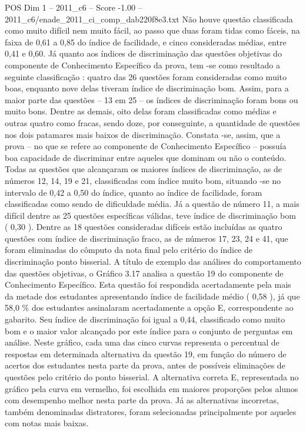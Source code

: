 \begin{textsample}{POS Dim 1 – 2011\_c6 – Score -1.00 – 2011\_c6/enade\_2011\_ci\_comp\_dab220f8e3.txt}
Não houve questão classificada como muito difícil nem muito fácil, ao passo que duas foram tidas como fáceis, na faixa de 0,61 a 0,85 do índice de facilidade, e cinco consideradas médias, entre 0,41 e 0,60.
Já quanto aos índices de discriminação das questões objetivas do componente de Conhecimento Específico da prova, tem -se como resultado a seguinte classificação : quatro das 26 questões foram consideradas como muito boas, enquanto nove delas tiveram índice de discriminação bom.
Assim, para a maior parte das questões – 13 em 25 – os índices de discriminação foram bons ou muito bons.
Dentre as demais, oito delas foram classificadas como médias e outras quatro como fracas, sendo doze, por conseguinte, a quantidade de questões nos dois patamares mais baixos de discriminação.
Constata -se, assim, que a prova – no que se refere ao componente de Conhecimento Específico – possuía boa capacidade de discriminar entre aqueles que dominam ou não o conteúdo.
Todas as questões que alcançaram os maiores índices de discriminação, as de números 12, 14, 19 e 21, classificadas com índice muito bom, situando -se no intervalo de 0,42 a 0,50 do índice, quanto ao índice de facilidade, foram classificadas como sendo de dificuldade média.
Já a questão de número 11, a mais difícil dentre as 25 questões específicas válidas, teve índice de discriminação bom ( 0,30 ).
Dentre as 18 questões consideradas difíceis estão incluídas as quatro questões com índice de discriminação fraco, as de números 17, 23, 24 e 41, que foram eliminadas do cômputo da nota final pelo critério do índice de discriminação ponto bisserial.
A título de exemplo das análises do comportamento das questões objetivas, o Gráfico 3.17 analisa a questão 19 do componente de Conhecimento Específico.
Esta questão foi respondida acertadamente pela mais da metade dos estudantes apresentando índice de facilidade médio ( 0,58 ), já que 58,0 \% dos estudantes assinalaram acertadamente a opção E, correspondente ao gabarito.
Seu índice de discriminação foi igual a 0,44, classificado como muito bom e o maior valor alcançado por este índice para o conjunto de perguntas em análise.
Neste gráfico, cada uma das cinco curvas representa o percentual de respostas em determinada alternativa da questão 19, em função do número de acertos dos estudantes nesta parte da prova, antes de possíveis eliminações de questões pelo critério do ponto bisserial.
A alternativa correta E, representada no gráfico pela curva em vermelho, foi escolhida em maiores proporções pelos alunos com desempenho melhor nesta parte da prova.
Já as alternativas incorretas, também denominadas distratores, foram selecionadas principalmente por aqueles com notas mais baixas.

\end{textsample}
